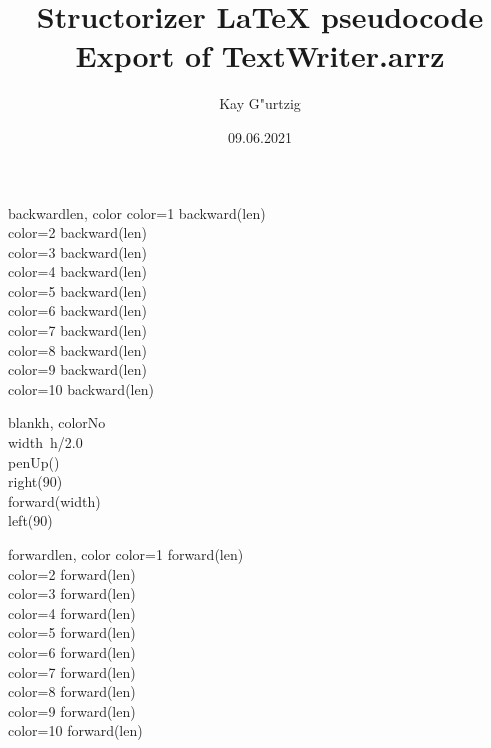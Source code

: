 \documentclass[a4paper,10pt]{article}
\title{Structorizer LaTeX pseudocode Export of TextWriter.arrz}
\author{Kay G"urtzig}
\date{09.06.2021}
\begin{document}
\begin{pseudocode}{backward}{len, color }
\label{backward}
  \IF color=1 \THEN
    backward(len)\\
  \ELSEIF color=2 \THEN
    backward(len)\\
  \ELSEIF color=3 \THEN
    backward(len)\\
  \ELSEIF color=4 \THEN
    backward(len)\\
  \ELSEIF color=5 \THEN
    backward(len)\\
  \ELSEIF color=6 \THEN
    backward(len)\\
  \ELSEIF color=7 \THEN
    backward(len)\\
  \ELSEIF color=8 \THEN
    backward(len)\\
  \ELSEIF color=9 \THEN
    backward(len)\\
  \ELSEIF color=10 \THEN
    backward(len)\\
\ENDPROCEDURE
\end{pseudocode}


\begin{pseudocode}{blank}{h, colorNo }
\label{blank}
\\
  width\gets\ h/2.0\\
  penUp()\\
  right(90)\\
  forward(width)\\
  left(90)\\
\ENDPROCEDURE
\end{pseudocode}


\begin{pseudocode}{forward}{len, color }
\label{forward}
  \IF color=1 \THEN
    forward(len)\\
  \ELSEIF color=2 \THEN
    forward(len)\\
  \ELSEIF color=3 \THEN
    forward(len)\\
  \ELSEIF color=4 \THEN
    forward(len)\\
  \ELSEIF color=5 \THEN
    forward(len)\\
  \ELSEIF color=6 \THEN
    forward(len)\\
  \ELSEIF color=7 \THEN
    forward(len)\\
  \ELSEIF color=8 \THEN
    forward(len)\\
  \ELSEIF color=9 \THEN
    forward(len)\\
  \ELSEIF color=10 \THEN
    forward(len)\\
\ENDPROCEDURE
\end{pseudocode}
\end{document}
